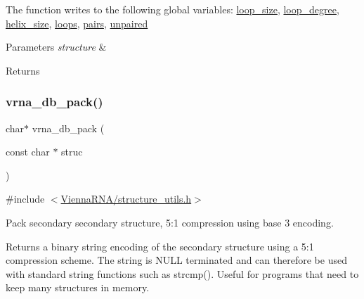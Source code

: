 The function writes to the following global variables\+: \hyperlink{group__struct__utils_ga3f31e0e48125601bfa57b52f8b038e8e}{loop\+\_\+size}, \hyperlink{group__struct__utils_gaef14e2f8ab3f61e8e659ba6b9003b08a}{loop\+\_\+degree}, \hyperlink{group__struct__utils_ga8218c0d581a3fba2a1a56a196abe19a5}{helix\+\_\+size}, \hyperlink{group__struct__utils_ga439fcb9f8d4f9f4d2227fde5fbfecb30}{loops}, \hyperlink{group__struct__utils_ga6341cbb704924824e0236c1dce791032}{pairs}, \hyperlink{group__struct__utils_gadd2f952597e02d66e1116a9d11d252d6}{unpaired}


\begin{DoxyParams}{Parameters}
{\em structure} & \\
\hline
\end{DoxyParams}
\begin{DoxyReturn}{Returns}

\end{DoxyReturn}
\mbox{\label{group__struct__utils_ga55c4783060a1464f862f858d5599c9e1}} 
\subsubsection{\texorpdfstring{vrna\+\_\+db\+\_\+pack()}{vrna\_db\_pack()}}
{\footnotesize\ttfamily char$\ast$ vrna\+\_\+db\+\_\+pack (\begin{DoxyParamCaption}\item[{const char $\ast$}]{struc }\end{DoxyParamCaption})}



{\ttfamily \#include $<$\hyperlink{structure__utils_8h}{Vienna\+R\+N\+A/structure\+\_\+utils.\+h}$>$}



Pack secondary secondary structure, 5\+:1 compression using base 3 encoding. 

Returns a binary string encoding of the secondary structure using a 5\+:1 compression scheme. The string is N\+U\+LL terminated and can therefore be used with standard string functions such as strcmp(). Useful for programs that need to keep many structures in memory.

